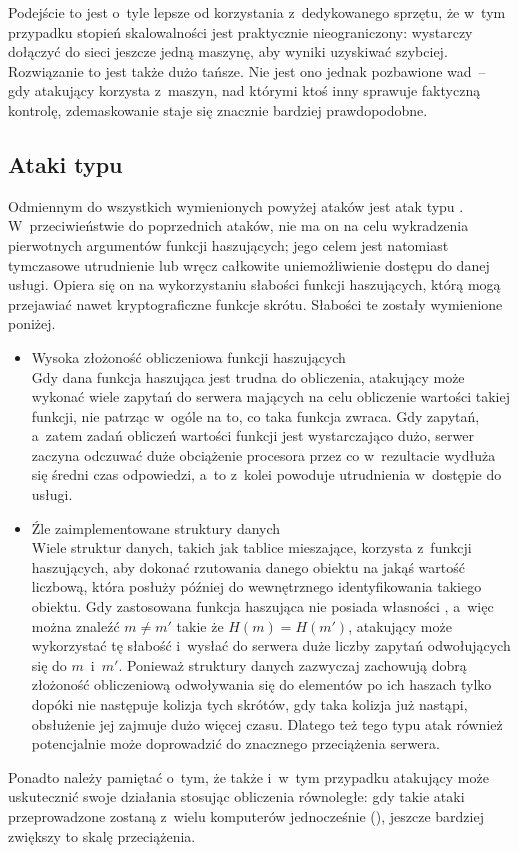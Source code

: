 Podejście to jest o~tyle lepsze od korzystania z~dedykowanego sprzętu, że w~tym
przypadku stopień skalowalności jest praktycznie nieograniczony: wystarczy
dołączyć do sieci jeszcze jedną maszynę, aby wyniki uzyskiwać szybciej.
Rozwiązanie to jest także dużo tańsze. Nie jest ono jednak pozbawione wad~--
gdy atakujący korzysta z~maszyn, nad którymi ktoś inny sprawuje faktyczną
kontrolę, zdemaskowanie staje się znacznie bardziej prawdopodobne.



\subsection{Ataki typu }
Odmiennym do wszystkich wymienionych powyżej ataków jest atak typu . W~przeciwieństwie do poprzednich ataków, nie ma on na celu
wykradzenia pierwotnych argumentów funkcji haszujących; jego celem jest
natomiast tymczasowe utrudnienie lub wręcz całkowite uniemożliwienie dostępu do
danej usługi. Opiera się on na wykorzystaniu słabości funkcji haszujących,
którą mogą przejawiać nawet kryptograficzne funkcje skrótu. Słabości te
zostały wymienione poniżej.

\begin{itemize}

    \item Wysoka złożoność obliczeniowa funkcji haszujących \\
    Gdy dana funkcja haszująca jest trudna do obliczenia, atakujący może
    wykonać wiele zapytań do serwera mających na celu obliczenie wartości
    takiej funkcji, nie patrząc w~ogóle na to, co taka funkcja zwraca. Gdy
    zapytań, a~zatem zadań obliczeń wartości funkcji jest wystarczająco dużo,
    serwer zaczyna odczuwać duże obciążenie procesora przez co w~rezultacie
    wydłuża się średni czas odpowiedzi, a~to z~kolei powoduje utrudnienia
    w~dostępie do usługi.

    \item Źle zaimplementowane struktury danych \\
    Wiele struktur danych, takich jak tablice mieszające, korzysta z~funkcji
    haszujących, aby dokonać rzutowania danego obiektu na jakąś wartość
    liczbową, która posłuży później do wewnętrznego identyfikowania takiego
    obiektu. Gdy zastosowana funkcja haszująca nie posiada własności
    , a~więc można znaleźć $m \neq m'$ takie że $H(m)
    = H(m')$, atakujący może wykorzystać tę słabość i~wysłać do serwera duże
    liczby zapytań odwołujących się do $m$~i~$m'$. Ponieważ struktury danych
    zazwyczaj zachowują dobrą złożoność obliczeniową odwoływania się do
    elementów po ich haszach tylko dopóki nie następuje kolizja tych skrótów,
    gdy taka kolizja już nastąpi, obsłużenie jej zajmuje dużo więcej czasu.
    Dlatego też tego typu atak również potencjalnie może doprowadzić do
    znacznego przeciążenia serwera.

\end{itemize}

Ponadto należy pamiętać o~tym, że także i~w~tym przypadku atakujący może
uskutecznić swoje działania stosując obliczenia równoległe: gdy takie ataki
przeprowadzone zostaną z~wielu komputerów jednocześnie (), jeszcze bardziej zwiększy to skalę przeciążenia.
